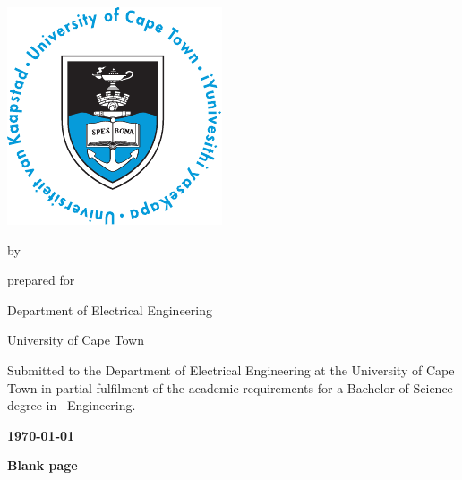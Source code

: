 \begin{titlepage}
  \null\vfill
  {\centering\Huge\bfseries\thetitle\par}
  \vfill
  \vskip 5mm
  {\centering\includegraphics[scale=1.1]{figures/logo}\par}
  \vfill
  \begin{center}by \textsc{\theauthor}\end{center}
  \vfill
  {\centering prepared for \textsc{\thesupervisor}\par Department of Electrical Engineering\par University of Cape Town\par}
  \vfill
  \noindent
  Submitted to the Department of Electrical Engineering at the University of Cape Town in partial fulfilment of the academic requirements for a Bachelor of Science degree in \thestream~Engineering.
  \vfill
  \begin{center}\bfseries\today\end{center}
  \vfill
\end{titlepage}
{\centering\bfseries Blank page\par}
\newpage